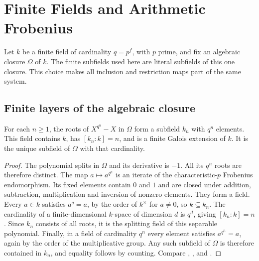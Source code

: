 \chapter{Finite Fields and Arithmetic Frobenius}
\label{ch:finite-fields}

Let \(k\) be a finite field of cardinality \(q=p^f\), with \(p\)
prime, and fix an algebraic closure \(\Omega\) of \(k\).
The finite subfields used here are literal subfields of this one
closure. This choice makes all inclusion and restriction maps part
of the same system.

\section{Finite layers of the algebraic closure}

\begin{proposition}\label{res:E01}
For each \(n\geq 1\), the roots of \(X^{q^n}-X\) in \(\Omega\)
form a subfield \(k_n\) with \(q^n\) elements. This field contains
\(k\), has \([k_n:k]=n\), and is a finite Galois extension of \(k\).
It is the unique subfield of \(\Omega\) with that cardinality.
\end{proposition}
\begin{proof}
The polynomial splits in \(\Omega\) and its derivative is \(-1\).
All its \(q^n\) roots are therefore distinct. The map
\(a\mapsto a^{q^n}\) is an iterate of the characteristic-\(p\)
Frobenius endomorphism. Its fixed elements contain \(0\) and \(1\)
and are closed under addition, subtraction, multiplication and
inversion of nonzero elements. They form a field. Every \(a\in k\)
satisfies \(a^q=a\), by the order of \(k^\times\) for \(a\ne0\),
so \(k\subseteq k_n\). The cardinality of a finite-dimensional
\(k\)-space of dimension \(d\) is \(q^d\), giving \([k_n:k]=n\).
Since \(k_n\) consists of all roots, it is the splitting field of
this separable polynomial. Finally, in a field of cardinality
\(q^n\) every element satisfies \(a^{q^n}=a\), again by the order of
the multiplicative group. Any such subfield of \(\Omega\) is therefore
contained in \(k_n\), and equality follows by counting.
Compare \cite[Propositions 4.20 and 4.23]{milne},
\cite[Theorem 2.5]{ln}, and \cite[Chapter 13]{d07}.
\end{proof}

